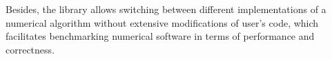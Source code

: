 \documentclass[a0paper, twocolumn, csc, english, final]{mpi2015_poster}
\begin{document}
\begin{poster}
\begin{pcolumn}
\begin{pbox}
      Besides, the library allows switching between different implementations
      of a numerical algorithm without extensive modifications of user's code,
      which facilitates benchmarking numerical software in terms of performance
      and correctness.
    \end{pbox}
    \begin{pbox}
      \vspace{1em}
      \printbibliography[]
    \end{pbox}
  \end{pcolumn}
\end{poster}
\end{document}
